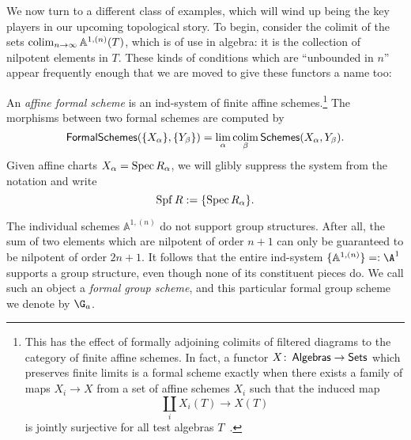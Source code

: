 We now turn to a different class of examples, which will wind up being the key players in our upcoming topological story.  To begin, consider the colimit of the sets $\operatorname*{colim}_{n \to \infty} \mathbb A^{1,(n)}(T)$, which is of use in algebra: it is the collection of nilpotent elements in $T$.  These kinds of conditions which are ``unbounded in $n$'' appear frequently enough that we are moved to give these functors a name too:
\begin{definition}
An \textit{affine formal scheme} is an ind-system of finite affine schemes.\footnote{This has the effect of formally adjoining colimits of filtered diagrams to the category of finite affine schemes.  In fact, a functor $X\colon\thinspace \mathsf{Algebras} \to \mathsf{Sets}$ which preserves finite limits is a formal scheme exactly when there exists a family of maps $X_i \to X$ from a set of affine schemes $X_i$ such that the induced map \[\coprod_i X_i(T) \to X(T)\] is jointly surjective for all test algebras $T$~\cite[Proposition 4.6]{StricklandFSFG}.}  The morphisms between two formal schemes are computed by \[\mathsf{FormalSchemes}(\{X_\alpha\}, \{Y_\beta\}) = \lim_\alpha \operatorname*{colim}_\beta \mathsf{Schemes}(X_\alpha, Y_\beta).\]  Given affine charts $X_\alpha = \operatorname{Spec} R_\alpha$, we will glibly suppress the system from the notation and write \[\operatorname{Spf} R := \{\operatorname{Spec} R_\alpha\}.\]
\end{definition}

\begin{example}\label{FormalGaExample}
The individual schemes $\mathbb A^{1, (n)}$ do not support group structures.  After all, the sum of two elements which are nilpotent of order $n+1$ can only be guaranteed to be nilpotent of order $2n+1$.  It follows that the entire ind-system $\{\mathbb A^{1, (n)}\} =: \A^1$ supports a group structure, even though none of its constituent pieces do.  We call such an object a \textit{formal group scheme}, and this particular formal group scheme we denote by $\G_a$.
\end{example}

